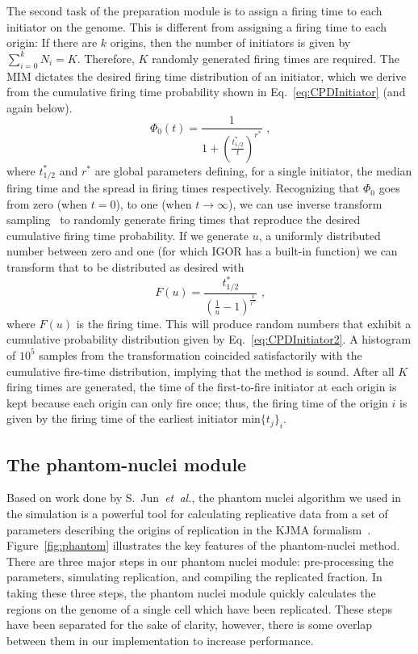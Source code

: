 		The second task of the preparation module is to assign a firing time to each initiator on the genome.
		This is different from assigning a firing time to each origin: If there are $k$ origins, then the number of initiators is given by $\sum\nolimits_{i=0}^k N_i = K$.
		Therefore, $K$ randomly generated firing times are required.
		The MIM dictates the desired firing time distribution of an initiator, which we derive from the cumulative firing time probability shown in Eq.~\ref{eq:CPDInitiator} (and again below).
		\begin{equation} \label{eq:CPDInitiator2}
			\Phi_0(t) = \frac{1}{1+\left(\frac{t^*_{1/2}}{t}\right)^{r^*}}\text{ ,}
		\end{equation}
		where $t^*_{1/2}$ and $r^*$ are global parameters defining, for a single initiator, the median firing time and the spread in firing times respectively. 
		Recognizing that $\Phi_0$ goes from zero (when $t=0$), to one (when $t \rightarrow \infty$), we can use inverse transform sampling~\cite{NumRec} to randomly generate firing times that reproduce the desired cumulative firing time probability.
		If we generate $u$, a uniformly distributed number between zero and one (for which IGOR has a built-in function) we can transform that to be distributed as desired with
		\begin{equation}
			F(u) = \frac{t^*_{1/2}}{\left(\frac{1}{u}-1\right)^\frac{1}{r^*}} \text{ ,}
		\end{equation}
		where $F(u)$ is the firing time.
		This will produce random numbers that exhibit a cumulative probability distribution given by Eq.~\ref{eq:CPDInitiator2}.
		A histogram of $10^5$ samples from the transformation coincided satisfactorily with the cumulative fire-time distribution, implying that the method is sound.
		After all $K$ firing times are generated, the time of the first-to-fire initiator at each origin is kept because each origin can only fire once; thus, the firing time of the origin $i$ is given by the firing time of the earliest initiator $\text{min}\{t_j\}_i$.
		
		
		\subsection{The phantom-nuclei module}
		\label{subsec:PhanNuc}
		
		Based on work done by S.~Jun~\emph{et~al.}, the phantom nuclei algorithm we used in the simulation is a powerful tool for calculating replicative data from a set of parameters describing the origins of replication in the KJMA formalism~\cite{KJMA1}.
		Figure~\ref{fig:phantom} illustrates the key features of the phantom-nuclei method.
		There are three major steps in our phantom nuclei module: pre-processing the parameters, simulating replication, and compiling the replicated fraction.
		In taking these three steps, the phantom nuclei module quickly calculates the regions on the genome of a single cell which have been replicated.
		These steps have been separated for the sake of clarity, however, there is some overlap between them in our implementation to increase performance.
		
